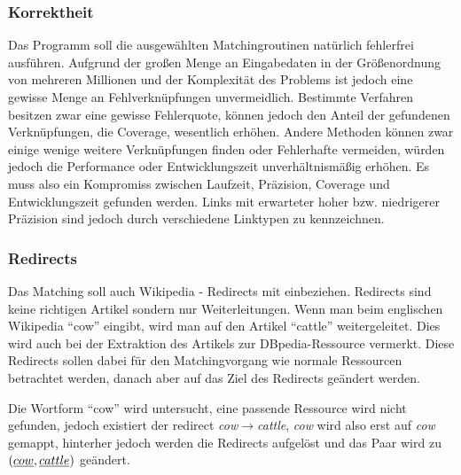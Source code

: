 \subsubsection{Korrektheit}
Das Programm soll die ausgewählten Matchingroutinen natürlich fehlerfrei ausführen.
Aufgrund der großen Menge an Eingabedaten in der Größenordnung von mehreren Millionen und der Komplexität des Problems ist jedoch eine gewisse Menge an Fehlverknüpfungen unvermeidlich.
Bestimmte Verfahren besitzen zwar eine gewisse Fehlerquote, können jedoch den Anteil der gefundenen Verknüpfungen, die Coverage, wesentlich erhöhen.
Andere Methoden können zwar einige wenige weitere Verknüpfungen finden oder Fehlerhafte vermeiden, würden jedoch die Performance oder Entwicklungszeit unverhältnismäßig erhöhen.
Es muss also ein Kompromiss zwischen Laufzeit, Präzision, Coverage und Entwicklungszeit gefunden werden.
Links mit erwarteter hoher bzw. niedrigerer Präzision sind jedoch durch verschiedene Linktypen zu kennzeichnen.

\subsubsection{Redirects}
Das Matching soll auch Wikipedia - Redirects mit einbeziehen.
Redirects sind keine richtigen Artikel sondern nur Weiterleitungen.
Wenn man beim englischen Wikipedia \zb{} "`cow"' eingibt, wird man auf den Artikel "`cattle"' weitergeleitet.
Dies wird auch bei der Extraktion des Artikels zur DBpedia-Ressource vermerkt.
Diese Redirects sollen dabei für den Matchingvorgang wie normale Ressourcen betrachtet werden, danach aber auf das Ziel des Redirects geändert werden.

\begin{bsp}
Die Wortform "`cow"' wird untersucht, eine passende Ressource wird nicht gefunden, jedoch existiert der redirect \emph{cow}$\rightarrow$\emph{cattle},
\emph{cow} wird also erst auf \emph{cow} gemappt, hinterher jedoch werden die Redirects aufgelöst und das Paar wird zu $(\emph{cow},\emph{cattle})$ geändert.
\end{bsp}

